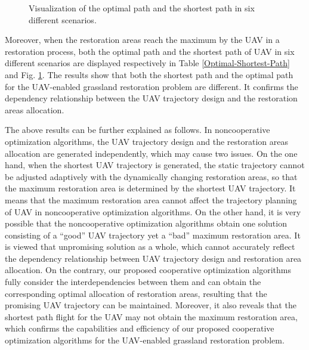 \documentclass[preprint,5pt]{elsarticle}
\begin{document}
\begin{figure}[htb]
{    }
\caption{Visualization of the optimal path and the shortest path in six different scenarios.} \label{Visualization-Path}
\end{figure}

Moreover, when the restoration areas reach the maximum by the UAV in a restoration process, both the optimal path and the shortest path of UAV in six different scenarios are displayed respectively in Table \ref{Optimal-Shortest-Path} and Fig. \ref{Visualization-Path}. The results show that both the shortest path and the optimal path for the UAV-enabled grassland restoration problem are different. It confirms the dependency relationship between the UAV trajectory design and the restoration areas allocation.

The above results can be further explained as follows. In noncooperative optimization algorithms, the UAV trajectory design and the restoration areas allocation are generated independently, which may cause two issues. On the one hand, when the shortest UAV trajectory is generated, the static trajectory cannot be adjusted adaptively with the dynamically changing restoration areas, so that the maximum restoration area is determined by the shortest UAV trajectory. It means that the maximum restoration area cannot affect the trajectory planning of UAV in noncooperative optimization algorithms. On the other hand, it is very possible that the noncooperative optimization algorithms obtain one solution consisting of a ``good'' UAV trajectory yet a ``bad'' maximum restoration area. It is viewed that unpromising solution as a whole, which cannot accurately reflect the dependency relationship between UAV trajectory design and restoration area allocation. On the contrary, our proposed cooperative optimization algorithms fully consider the interdependencies between them and can obtain the corresponding optimal allocation of restoration areas, resulting that the promising UAV trajectory can be maintained. Moreover, it also reveals that the shortest path flight for the UAV may not obtain the maximum restoration area, which confirms the capabilities and efficiency of our proposed cooperative optimization algorithms for the UAV-enabled grassland restoration problem.
\end{document}
